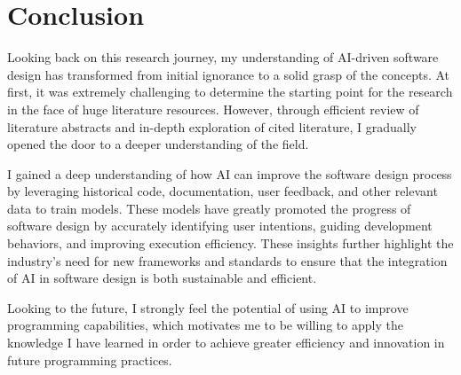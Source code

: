 \documentclass{article}
\begin{document}
\section{Conclusion}

Looking back on this research journey, my understanding of AI-driven software design has transformed from initial ignorance to 
a solid grasp of the concepts. At first, it was extremely challenging to determine the starting point for the research in the face of huge 
literature resources. However, through efficient review of literature abstracts and in-depth exploration of cited literature, I 
gradually opened the door to a deeper understanding of the field.

I gained a deep understanding of how AI can improve the software design process by leveraging historical code, documentation, user 
feedback, and other relevant data to train models. These models have greatly promoted the progress of software design by 
accurately identifying user intentions, guiding development behaviors, and improving execution efficiency. These insights 
further highlight the industry’s need for new frameworks and standards to ensure that the integration of AI in software 
design is both sustainable and efficient.

Looking to the future, I strongly feel the potential of using AI to improve programming capabilities, which motivates me to be willing 
to apply the knowledge I have learned in order to achieve greater efficiency and innovation in future programming practices.



\newpage %



\end{document}
